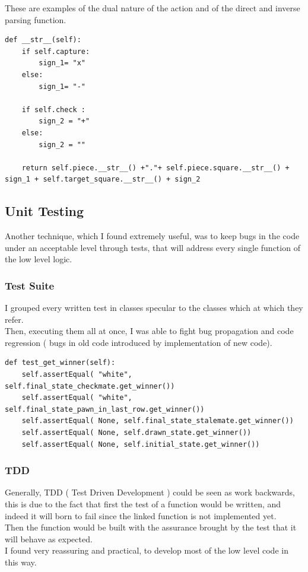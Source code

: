 \documentclass{article}
\begin{document}
				These are examples of the dual nature of the action and of the direct and inverse parsing function.\medskip\\

\begin{lstlisting}[caption=inverse mapping, label=exepred]
def __str__(self):
	if self.capture:
		sign_1= "x"
	else:
		sign_1= "-"

	if self.check :
		sign_2 = "+"
	else:
		sign_2 = ""

	return self.piece.__str__() +"."+ self.piece.square.__str__() + sign_1 + self.target_square.__str__() + sign_2
\end{lstlisting}
				\newpage



				\subsection{Unit Testing}
				Another technique, which I found extremely useful, was to keep bugs in the code under an acceptable level through tests, that will address every single function of the low level logic.\medskip\\

				\subsubsection{Test Suite}
				I grouped every written test in classes specular to the classes which at which they refer.\smallskip\\
				Then, executing them all at once, I was able to fight bug propagation and code regression ( bugs in old code introduced by implementation of new code).\medskip\\
				

				\begin{lstlisting}[caption=one test in State.py, label=exepred]
def test_get_winner(self):
	self.assertEqual( "white", self.final_state_checkmate.get_winner())
	self.assertEqual( "white", self.final_state_pawn_in_last_row.get_winner())
	self.assertEqual( None, self.final_state_stalemate.get_winner())
	self.assertEqual( None, self.drawn_state.get_winner())
	self.assertEqual( None, self.initial_state.get_winner())
\end{lstlisting}
				\subsubsection{TDD}
				Generally, TDD ( Test Driven Development ) could be seen as work backwards, this is due to the fact that first the test of a function would be written, and indeed it will born to fail since the linked function is not implemented yet.\medskip\\
				Then the function would be built with the assurance brought by the test that it will behave as expected.\medskip\\
				I found very reassuring and practical, to develop most of the low level code in this way.\medskip\\
				
\end{document}
